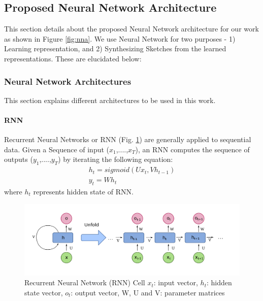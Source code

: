\subsection{Proposed Neural Network Architecture}
This section details about the proposed Neural Network architecture for our work as shown in Figure \ref{fig:nna}. We use Neural Network for two purposes - 1) Learning representation, and 2) Synthesizing Sketches from the learned representations. These are elucidated below:


\subsubsection{Neural Network Architectures}
This section explains different architectures to be used in this work.

\paragraph{RNN}
Recurrent Neural Networks or RNN (Fig. \ref{fig:rnn}) are generally applied to sequential data. Given a Sequence of input ($x_1$,....,$x_T$), an RNN computes the sequence of outputs ($y_1$,....,$y_T$) by iterating the following equation:
\begin{align*}
    h_t = sigmoid(U{x_t}, V{h_{t-1}})\\
    y_t = W{h_t}
\end{align*}
where $h_t$ represents hidden state of RNN.
\begin{figure}
    \centering
    \includegraphics[scale=0.2]{rnnunfolding.png}
    \caption{Recurrent Neural Network (RNN) Cell $x_t$: input vector, $h_t$: hidden state vector, $o_t$: output vector, W, U and V: parameter matrices}
    \label{fig:rnn}
\end{figure}


